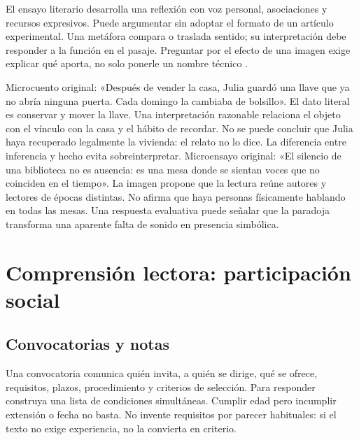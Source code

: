 El ensayo literario desarrolla una reflexión con voz personal, asociaciones y recursos expresivos. Puede argumentar sin adoptar el formato de un artículo experimental. Una metáfora compara o traslada sentido; su interpretación debe responder a la función en el pasaje. Preguntar por el efecto de una imagen exige explicar qué aporta, no solo ponerle un nombre técnico \cite[págs. 19--21]{ceneval}.

Microcuento original: «Después de vender la casa, Julia guardó una llave que ya no abría ninguna puerta. Cada domingo la cambiaba de bolsillo». El dato literal es conservar y mover la llave. Una interpretación razonable relaciona el objeto con el vínculo con la casa y el hábito de recordar. No se puede concluir que Julia haya recuperado legalmente la vivienda: el relato no lo dice. La diferencia entre inferencia y hecho evita sobreinterpretar.
Microensayo original: «El silencio de una biblioteca no es ausencia: es una mesa donde se sientan voces que no coinciden en el tiempo». La imagen propone que la lectura reúne autores y lectores de épocas distintas. No afirma que haya personas físicamente hablando en todas las mesas. Una respuesta evaluativa puede señalar que la paradoja transforma una aparente falta de sonido en presencia simbólica.

\section{Comprensión lectora: participación social}\label{sec:l3}
\subsection{Convocatorias y notas}
Una convocatoria comunica quién invita, a quién se dirige, qué se ofrece, requisitos, plazos, procedimiento y criterios de selección. Para responder construya una lista de condiciones simultáneas. Cumplir edad pero incumplir extensión o fecha no basta. No invente requisitos por parecer habituales: si el texto no exige experiencia, no la convierta en criterio.

